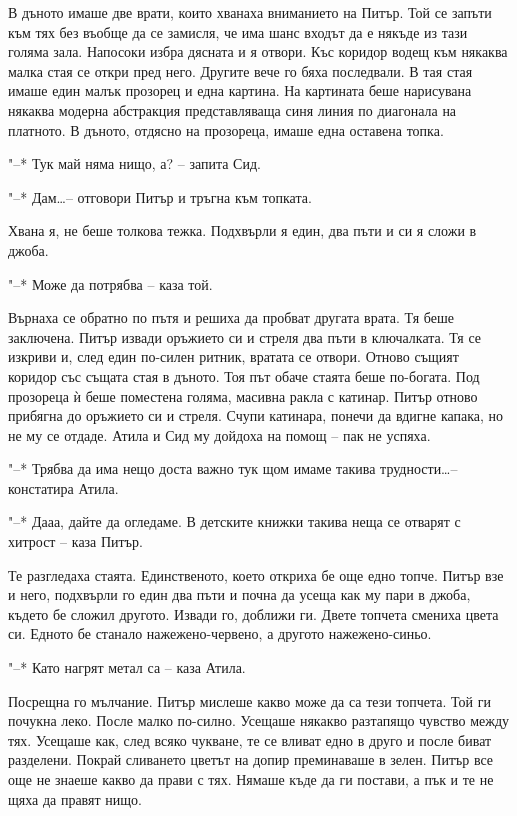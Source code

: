 \documentclass[ebook,openany,12pt]{memoir}
\begin{document}
В дъното имаше две врати, които хванаха вниманието на Питър. Той се запъти към тях без въобще да се замисля, че има шанс входът да е някъде из тази голяма зала. Напосоки избра дясната и я отвори. Къс коридор водещ към някаква малка стая се откри пред него. Другите вече го бяха последвали. В тая стая имаше един малък прозорец и една картина. На картината беше нарисувана някаква модерна абстракция представляваща синя линия по диагонала на платното. В дъното, отдясно на прозореца, имаше една оставена топка.

"--* Тук май няма нищо, а? – запита Сид.

"--* Дам\ldots -- отговори Питър и тръгна към топката.

Хвана я, не беше толкова тежка. Подхвърли я един, два пъти и си я сложи в джоба.

"--* Може да потрябва – каза той.

Върнаха се обратно по пътя и решиха да пробват другата врата. Тя беше заключена. Питър извади оръжието си и стреля два пъти в ключалката. Тя се изкриви и, след един по-силен ритник, вратата се отвори. Отново същият коридор със същата стая в дъното. Тоя път обаче стаята беше по-богата. Под прозореца ѝ беше поместена голяма, масивна ракла с катинар. Питър отново прибягна до оръжието си и стреля. Счупи катинара, понечи да вдигне капака, но не му се отдаде. Атила и Сид му дойдоха на помощ – пак не успяха.

"--* Трябва да има нещо доста важно тук щом имаме такива трудности\ldots -- констатира Атила.

"--* Дааа, дайте да огледаме. В детските книжки такива неща се отварят с хитрост – каза Питър.

Те разгледаха стаята. Единственото, което откриха бе още едно топче. Питър взе и него, подхвърли го един два пъти и почна да усеща как му пари в джоба, където бе сложил другото. Извади го, доближи ги. Двете топчета смениха цвета си. Едното бе станало нажежено-червено, а другото нажежено-синьо.

"--* Като нагрят метал са – каза Атила.

Посрещна го мълчание. Питър мислеше какво може да са тези топчета. Той ги почукна леко. После малко по-силно. Усещаше някакво разтапящо чувство между тях. Усещаше как, след всяко чукване, те се вливат едно в друго и после биват разделени. Покрай сливането цветът на допир преминаваше в зелен. Питър все още не знаеше какво да прави с тях. Нямаше къде да ги постави, а пък и те не щяха да правят нищо.
\end{document}
